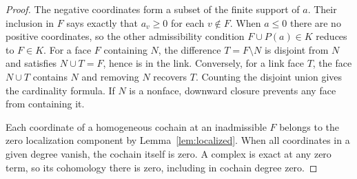 \begin{proof}
\leanok
The negative coordinates form a subset of the finite support of $a$.
Their inclusion in $F$ says exactly that $a_v\geq0$ for each $v\notin F$.
When $a\leq0$ there are no positive coordinates, so the other
admissibility condition $F\cup P(a)\in K$ reduces to $F\in K$.
For a face $F$ containing $N$, the difference $T=F\setminus N$ is
disjoint from $N$ and satisfies $N\cup T=F$, hence is in the link.
Conversely, for a link face $T$, the face $N\cup T$ contains $N$ and
removing $N$ recovers $T$. Counting the disjoint union gives the
cardinality formula. If $N$ is a nonface, downward closure prevents
any face from containing it.

Each coordinate of a homogeneous cochain at an inadmissible $F$ belongs
to the zero localization component by Lemma~\ref{lem:localized}.
When all coordinates in a given degree vanish, the cochain itself is zero.
A complex is exact at any zero term, so its cohomology there is zero,
including in cochain degree zero.
\end{proof}

